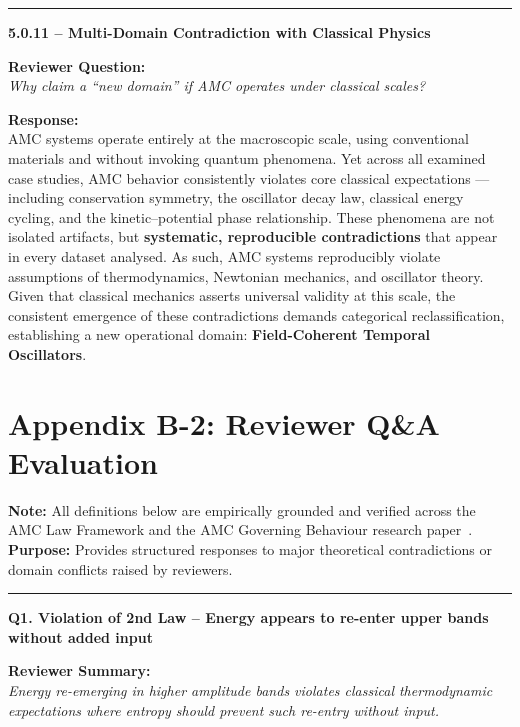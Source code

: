 \documentclass[10pt,aps,pre,onecolumn,superscriptaddress,notitlepage]{revtex4-2}
\begin{document}
\vspace{1em}
\hrule
\vspace{1em}

\textbf{5.0.11 – Multi-Domain Contradiction with Classical Physics}

\textbf{Reviewer Question:} \\
\textit{Why claim a “new domain” if AMC operates under classical scales?}

\textbf{Response:} \\
AMC systems operate entirely at the macroscopic scale, using conventional materials and without invoking quantum phenomena. Yet across all examined case studies, AMC behavior consistently violates core classical expectations — including conservation symmetry, the oscillator decay law, classical energy cycling, and the kinetic–potential phase relationship. These phenomena are not isolated artifacts, but \textbf{systematic, reproducible contradictions} that appear in every dataset analysed. As such, AMC systems reproducibly violate assumptions of thermodynamics, Newtonian mechanics, and oscillator theory. Given that classical mechanics asserts universal validity at this scale, the consistent emergence of these contradictions demands categorical reclassification, establishing a new operational domain: \textbf{Field-Coherent Temporal Oscillators}.

\clearpage
\section*{Appendix B-2: Reviewer Q\&A Evaluation}
\label{sec:appendixb-2C}

\noindent\textbf{Note:} All definitions below are empirically grounded and verified across the AMC Law Framework and the AMC Governing Behaviour research paper~\cite{karim2025governing}. \\
\textbf{Purpose:} Provides structured responses to major theoretical contradictions or domain conflicts raised by reviewers.

\vspace{1em}
\hrule
\vspace{1em}

\textbf{Q1. Violation of 2nd Law – Energy appears to re-enter upper bands without added input}

\textbf{Reviewer Summary:} \\
\textit{Energy re-emerging in higher amplitude bands violates classical thermodynamic expectations where entropy should prevent such re-entry without input.}
\end{document}
